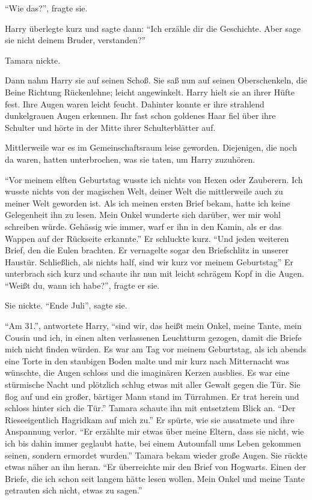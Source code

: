 \enquote{Wie das?}, fragte sie.

Harry überlegte kurz und sagte dann: \enquote{Ich erzähle dir die Geschichte. Aber sage sie nicht deinem Bruder, verstanden?}

Tamara nickte.

Dann nahm Harry sie auf seinen Schoß. Sie saß nun auf seinen Oberschenkeln, die Beine Richtung Rückenlehne; leicht angewinkelt. Harry hielt sie an ihrer Hüfte fest. Ihre Augen waren leicht feucht. Dahinter konnte er ihre strahlend dunkelgrauen Augen erkennen. Ihr fast schon goldenes Haar fiel über ihre Schulter und hörte in der Mitte ihrer Schulterblätter auf.

Mittlerweile war es im Gemeinschaftsraum leise geworden. Diejenigen, die noch da waren, hatten unterbrochen, was sie taten, um Harry zuzuhören.

\enquote{Vor meinem elften Geburtstag wusste ich nichts von Hexen oder Zauberern. Ich wusste nichts von der magischen Welt, deiner Welt \gst die mittlerweile auch zu meiner Welt geworden ist. Als ich meinen ersten Brief bekam, hatte ich keine Gelegenheit ihn zu lesen. Mein Onkel wunderte sich darüber, wer mir wohl schreiben würde. Gehässig wie immer, warf er ihn in den Kamin, als er das Wappen auf der Rückseite erkannte.} Er schluckte kurz. \enquote{Und jeden weiteren Brief, den die Eulen brachten. Er vernagelte sogar den Briefschlitz in unserer Haustür. Schließlich, als nichts half, sind wir kurz vor meinem Geburtstag\abs} Er unterbrach sich kurz und schaute ihr nun mit leicht schrägem Kopf in die Augen. \enquote{Weißt du, wann ich habe?}, fragte er sie.

Sie nickte. \enquote{Ende Juli}, sagte sie.

\enquote{Am 31.}, antwortete Harry, \enquote{sind wir, das heißt mein Onkel, meine Tante, mein Cousin und ich, in einen alten verlassenen Leuchtturm gezogen, damit die Briefe mich nicht finden würden. Es war am Tag vor meinem Geburtstag, als ich abends eine Torte in den staubigen Boden malte und mir kurz nach Mitternacht was wünschte, die Augen schloss und die imaginären Kerzen ausblies. Es war eine stürmische Nacht und plötzlich schlug etwas mit aller Gewalt gegen die Tür. Sie flog auf und ein großer, bärtiger Mann stand im Türrahmen. Er trat herein und schloss hinter sich die Tür.} Tamara schaute ihn mit entsetztem Blick an. \enquote{Der Riese\abs eigentlich Hagrid\abs kam auf mich zu.} Er spürte, wie sie ausatmete und ihre Anspannung verlor. \enquote{Er erzählte mir etwas über meine Eltern, dass sie nicht, wie ich bis dahin immer geglaubt hatte, bei einem Autounfall ums Leben gekommen seinen, sondern ermordet wurden.} Tamara bekam wieder große Augen. Sie rückte etwas näher an ihn heran. \enquote{Er überreichte mir den Brief von Hogwarts. Einen der Briefe, die ich schon seit langem hätte lesen wollen. Mein Onkel und meine Tante getrauten sich nicht, etwas zu sagen.}

